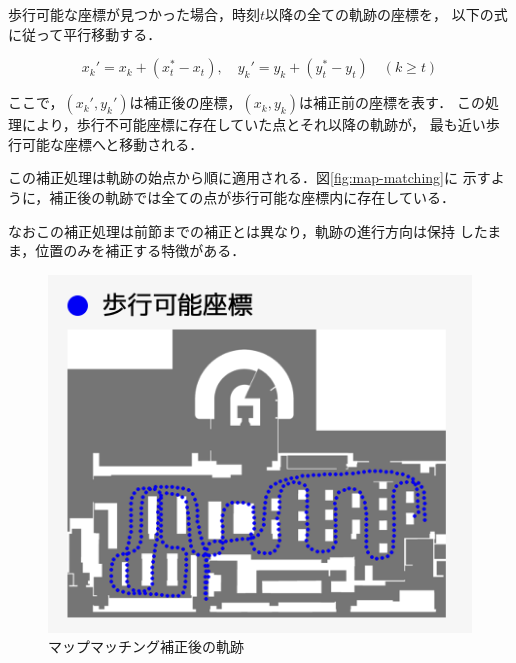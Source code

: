 歩行可能な座標が見つかった場合，時刻$t$以降の全ての軌跡の座標を，
以下の式に従って平行移動する．

\begin{equation}
x_k' = x_k + (x_t^* - x_t), \quad y_k' = y_k + (y_t^* - y_t) \quad (k \geq t)
\end{equation}

ここで，$(x_k', y_k')$は補正後の座標，$(x_k, y_k)$は補正前の座標を表す．
この処理により，歩行不可能座標に存在していた点とそれ以降の軌跡が，
最も近い歩行可能な座標へと移動される．

この補正処理は軌跡の始点から順に適用される．図\ref{fig:map-matching}に
示すように，補正後の軌跡では全ての点が歩行可能な座標内に存在している．

なおこの補正処理は前節までの補正とは異なり，軌跡の進行方向は保持
したまま，位置のみを補正する特徴がある．
\begin{figure}[H]
    \centering
    \includegraphics[width=\linewidth]{image/walkable-points.jpg}
    \caption{マップマッチング補正後の軌跡}    \label{fig:walkable-points}
\end{figure}
